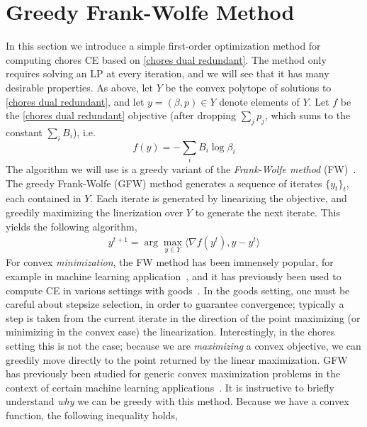 \documentclass[format=acmsmall,authorversion]{acmart}
\newcommand{\ck}[1]{{\textcolor{red}{CK: #1}}}
\newcommand{\ntl}[1]{{\textcolor{teal}{Tianlong: #1}}}
\begin{document}
\section{Greedy Frank-Wolfe Method}
\label{Sec:Alg}
In this section we introduce a simple first-order optimization method for computing chores CE based on \ref{chores dual redundant}. The method only requires solving an LP at every iteration, and we will see that it has many desirable properties.
As above, let $Y$ be the  convex polytope of solutions to \ref{chores dual redundant}, and let 
$y = (\beta, p)\in Y$ denote elements of $Y$.
Let $f$ be the \ref{chores dual redundant} objective (after dropping $\sum_j p_j$, which sums to the constant $\sum_i B_i$), i.e.
\[
    f(y) = -\sum_i B_i \log \beta_i
\]
The algorithm we will use is a greedy variant of the \emph{Frank-Wolfe method} (FW)~\citep{frank1956algorithm}.
The greedy Frank-Wolfe (GFW) method generates a sequence of iterates $\{y_t\}_t$, each contained in $Y$. Each iterate is generated by linearizing the objective, and greedily maximizing the linerization over $Y$ to generate the next iterate. This yields the following algorithm,
\begin{align}
    y^{t+1} = \arg\max_{y\in Y} \langle \nabla f(y^t), y - y^t \rangle
    \label{eq:gfw}
\end{align}
For convex \emph{minimization}, the FW method has been immensely popular, for example in machine learning application~\citep{jaggi2013revisiting}, and it has previously been used to compute CE in various settings with goods~\citep{gao2020first,panageas2021combinatorial}.
In the goods setting, one must be careful about stepsize selection, in order to guarantee convergence; typically a step is taken from the current iterate in the direction of the point maximizing (or minimizing in the convex case) the linearization.
Interestingly, in the chores setting this is not the case; because we are \emph{maximizing} a convex objective, we can greedily move directly to the point returned by the linear maximization.
GFW has previously been studied for generic convex maximization problems in the context of certain machine learning applications~\citep{mangasarian1996machine,journee2010generalized}.
It is instructive to briefly understand \emph{why} we can be greedy with this method. Because we have a convex function, the following inequality holds,
\end{document}
